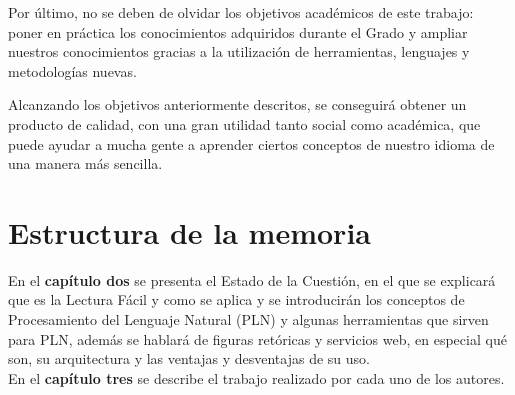 Por último, no se deben de olvidar los objetivos académicos de este trabajo: poner en práctica los conocimientos adquiridos durante el Grado y ampliar nuestros conocimientos gracias a la utilización de herramientas, lenguajes y metodologías nuevas.

Alcanzando los objetivos anteriormente descritos, se conseguirá obtener un producto de calidad, con una gran utilidad tanto social como académica, que puede ayudar a mucha gente a aprender ciertos conceptos de nuestro idioma de una manera más sencilla.
	
	
\section{Estructura de la memoria}
\label{cap:sec:estructuramemoria}


En el \textbf{capítulo dos} se presenta el Estado de la Cuestión, en el que se explicará que es la Lectura Fácil y como se aplica y se introducirán los conceptos de Procesamiento del Lenguaje Natural (PLN) y algunas herramientas que sirven para PLN, además se hablará de figuras retóricas y servicios web, en especial qué son, su arquitectura y las ventajas y desventajas de su uso.\\


En el \textbf{capítulo tres} se describe el trabajo realizado por cada uno de los autores.
